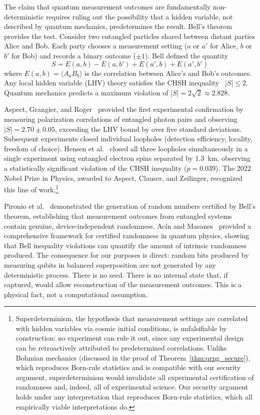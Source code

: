 \documentclass[journal]{IEEEtran}
\begin{document}
The claim that quantum measurement outcomes are fundamentally non-deterministic requires ruling out the possibility that a hidden variable, not described by quantum mechanics, predetermines the result. Bell's theorem~\cite{bell1964epr} provides the test. Consider two entangled particles shared between distant parties Alice and Bob. Each party chooses a measurement setting ($a$ or $a'$ for Alice, $b$ or $b'$ for Bob) and records a binary outcome ($\pm 1$). Bell defined the quantity
\begin{equation}
S = E(a, b) - E(a, b') + E(a', b) + E(a', b')
\label{eq:chsh}
\end{equation}
where $E(a, b) = \langle A_a B_b \rangle$ is the correlation between Alice's and Bob's outcomes. Any local hidden variable (LHV) theory satisfies the CHSH inequality~\cite{clauser1969chsh} $|S| \leq 2$. Quantum mechanics predicts a maximum violation of $|S| = 2\sqrt{2} \approx 2.828$.

Aspect, Grangier, and Roger~\cite{aspect1982epr} provided the first experimental confirmation by measuring polarization correlations of entangled photon pairs and observing $|S| = 2.70 \pm 0.05$, exceeding the LHV bound by over five standard deviations. Subsequent experiments closed individual loopholes (detection efficiency, locality, freedom of choice). Hensen et al.~\cite{hensen2015loophole} closed all three loopholes simultaneously in a single experiment using entangled electron spins separated by 1.3~km, observing a statistically significant violation of the CHSH inequality ($p = 0.039$). The 2022 Nobel Prize in Physics, awarded to Aspect, Clauser, and Zeilinger, recognized this line of work.\footnote{Superdeterminism, the hypothesis that measurement settings are correlated with hidden variables via cosmic initial conditions, is unfalsifiable by construction: no experiment can rule it out, since any experimental design can be retroactively attributed to predetermined correlations. Unlike Bohmian mechanics (discussed in the proof of Theorem~\ref{thm:qrng_secure}), which reproduces Born-rule statistics and is compatible with our security argument, superdeterminism would invalidate all experimental certification of randomness and, indeed, all of experimental science. Our security argument holds under any interpretation that reproduces Born-rule statistics, which all empirically viable interpretations do.}

Pironio et al.~\cite{pironio2010certified} demonstrated the generation of random numbers certified by Bell's theorem, establishing that measurement outcomes from entangled systems contain genuine, device-independent randomness. Ac\'{i}n and Masanes~\cite{acin2016certified} provided a comprehensive framework for certified randomness in quantum physics, showing that Bell inequality violations can quantify the amount of intrinsic randomness produced. The consequence for our purposes is direct: random bits produced by measuring qubits in balanced superposition are not generated by any deterministic process. There is no seed. There is no internal state that, if captured, would allow reconstruction of the measurement outcomes. This is a physical fact, not a computational assumption.
\end{document}
